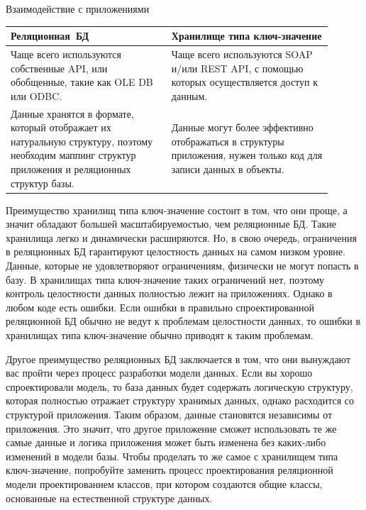 \documentclass[specialist,subf,href,colorlinks=true
]{disser}
\begin{document}
Взаимодействие с приложениями
\\ \begin{tabular}{p{0.45\linewidth}|p{0.45\linewidth}}
\hline
Реляционная\ БД & Хранилище типа ключ-значение  \\
\hline
Чаще всего используются собственные API, или обобщенные, такие как OLE DB или ODBC. &
Чаще всего используются SOAP и/или REST API, с помощью которых осуществляется доступ к данным. \\
\hline
Данные хранятся в формате, который отображает их натуральную структуру, поэтому необходим маппинг структур приложения и реляционных структур базы. &
Данные могут более эффективно отображаться в структуры приложения, нужен только код для записи данных в объекты. \\
\hline
\end{tabular}

Преимущество хранилищ типа ключ-значение состоит в том, что они проще, а значит обладают большей масштабируемостью, чем реляционные БД. Такие хранилища легко и динамически расширяются. Но, в свою очередь, ограничения в реляционных БД гарантируют целостность данных на самом низком уровне. Данные, которые не удовлетворяют ограничениям, физически не могут попасть в базу. В хранилищах типа ключ-значение таких ограничений нет, поэтому контроль целостности данных полностью лежит на приложениях. Однако в любом коде есть ошибки. Если ошибки в правильно спроектированной реляционной БД обычно не ведут к проблемам целостности данных, то ошибки в хранилищах типа ключ-значение обычно приводят к таким проблемам.

Другое преимущество реляционных БД заключается в том, что они вынуждают вас пройти через процесс разработки модели данных. Если вы хорошо спроектировали модель, то база данных будет содержать логическую структуру, которая полностью отражает структуру хранимых данных, однако расходится со структурой приложения. Таким образом, данные становятся независимы от приложения. Это значит, что другое приложение сможет использовать те же самые данные и логика приложения может быть изменена без каких-либо изменений в модели базы. Чтобы проделать то же самое с хранилищем типа ключ-значение, попробуйте заменить процесс проектирования реляционной модели проектированием классов, при котором создаются общие классы, основанные на естественной структуре данных.
\end{document}
